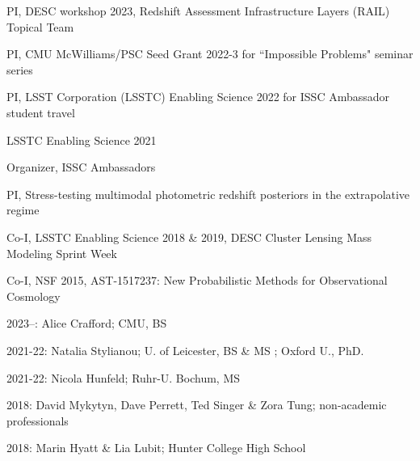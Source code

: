 \documentclass[11pt,letterpaper]{article}
\begin{document}
 \begin{list}{}{\malzlist}
 \item PI, DESC workshop 2023, Redshift Assessment Infrastructure Layers (RAIL) Topical Team
 \item PI, CMU McWilliams/PSC Seed Grant 2022-3 for ``Impossible Problems" seminar series
 \item PI, LSST Corporation (LSSTC) Enabling Science 2022 for ISSC Ambassador student travel
 \item LSSTC Enabling Science 2021
\begin{list}{}{\malzlist}
	\item Organizer, ISSC Ambassadors 
	\item PI, Stress-testing multimodal photometric redshift posteriors in the extrapolative regime
\end{list}
 \item Co-I, LSSTC Enabling Science 2018 \& 2019, DESC Cluster Lensing Mass Modeling Sprint Week%
\item Co-I, NSF 2015, AST-1517237: New Probabilistic Methods for Observational Cosmology
\end{list}

\begin{list}{}{\malzlist}
	\item 2023--: Alice Crafford; CMU, BS 
	\item 2021-22: Natalia Stylianou; U. of Leicester, BS \& MS ; Oxford U., PhD. 
	\item 2021-22: Nicola Hunfeld; Ruhr-U. Bochum, MS 
	\item 2018: David Mykytyn, Dave Perrett, Ted Singer \& Zora Tung; non-academic professionals
	\item 2018: Marin Hyatt \& Lia Lubit; Hunter College High School 
\end{list}

%
\clearpage
\end{document}
